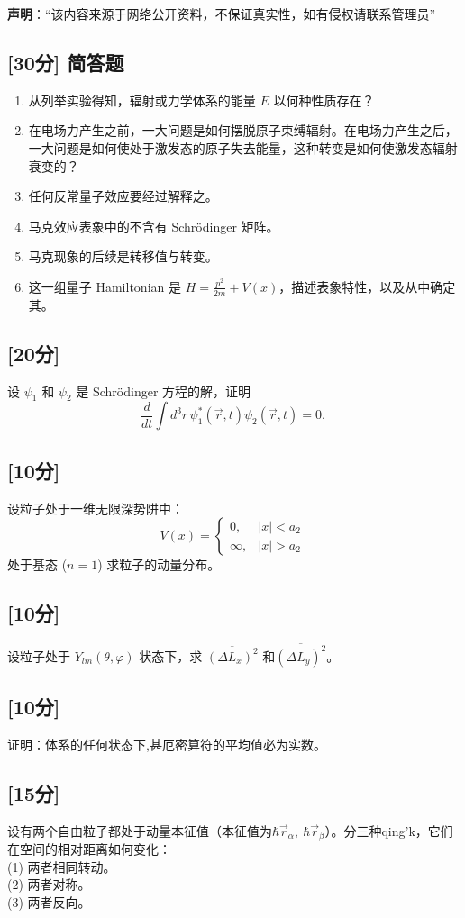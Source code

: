 
\textbf{声明}：“该内容来源于网络公开资料，不保证真实性，如有侵权请联系管理员”

\subsection{[30分] 简答题}
 \begin{enumerate}
        \item 从列举实验得知，辐射或力学体系的能量 $E$ 以何种性质存在？
        \item 在电场力产生之前，一大问题是如何摆脱原子束缚辐射。在电场力产生之后，一大问题是如何使处于激发态的原子失去能量，这种转变是如何使激发态辐射衰变的？
        \item 任何反常量子效应要经过解释之。
        \item 马克效应表象中的不含有 Schrödinger 矩阵。
        \item 马克现象的后续是转移值与转变。
        \item 这一组量子 Hamiltonian 是 $H = \frac{p^2}{2m} + V(x)$，描述表象特性，以及从中确定其。
    \end{enumerate}

\subsection{[20分]}
设 $\psi_1$ 和 $\psi_2$ 是 Schrödinger 方程的解，证明
\[
\frac{d}{dt} \int d^3r \, \psi_1^* (\vec{r}, t) \psi_2 (\vec{r}, t) = 0.~
\]

\subsection{[10分]}
设粒子处于一维无限深势阱中：
\[
V(x) =
\begin{cases}
0, & |x| < a_2 \\
\infty, & |x| > a_2
\end{cases}~
\]
处于基态 ($n=1$) 求粒子的动量分布。

\subsection{[10分]}
设粒子处于 $Y_{lm}(\theta, \varphi)$ 状态下，求 $\overline{(\Delta L_x)^2}$ 和$\overline{(\Delta L_y)^2}$。

\subsection{[10分]}
证明：体系的任何状态下,甚厄密算符的平均值必为实数。

\subsection{[15分]}
设有两个自由粒子都处于动量本征值（本征值为$\hbar \vec{r}_\alpha, \ \hbar \vec{r}_\beta$）。分三种qing'k，它们在空间的相对距离如何变化：\\
(1) 两者相同转动。\\
(2) 两者对称。\\
(3) 两者反向。
